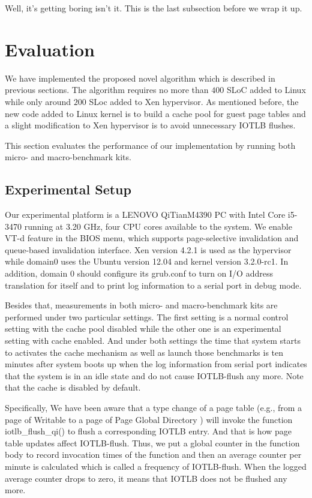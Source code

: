 \documentclass[letterpaper,twocolumn,10pt]{article}
\begin{document}
Well, it's getting boring isn't it.  This is the last subsection
before we wrap it up.

\section{Evaluation}

We have implemented the proposed novel algorithm which is described in previous sections. The algorithm requires no more than $400$ SLoC added to Linux while only around $200$ SLoc added to Xen hypervisor. As mentioned before, the new code added to Linux kernel is to build a cache pool for guest page tables and a slight modification to Xen hypervisor is to avoid unnecessary IOTLB flushes.

This section evaluates the performance of our implementation by running both micro- and macro-benchmark kits.

\subsection{Experimental Setup}

Our experimental platform is a LENOVO QiTianM4390 PC with Intel Core i5-3470 running at 3.20 GHz, four CPU cores available to the system. We enable VT-d feature in the BIOS menu, which supports page-selective invalidation and queue-based invalidation interface. Xen version 4.2.1 is used as the hypervisor while domain0 uses the Ubuntu version 12.04 and kernel version 3.2.0-rc1. In addition, domain 0 should configure its grub.conf to turn on I/O address translation for itself and to print log information to a serial port in debug mode.

Besides that, measurements in both micro- and macro-benchmark kits are performed under two particular settings. The first setting is a normal control setting with the cache pool disabled while the other one is an experimental setting with cache enabled. And under both settings the time that system starts to activates the cache mechanism as well as launch those benchmarks is ten minutes after system boots up when the log information from serial port indicates that the system is in an idle state and do not cause IOTLB-flush any more. Note that the cache is disabled by default. 

Specifically, We have been aware that a type change of a page table (e.g., from a page of Writable to a page of Page Global Directory ) will invoke the function iotlb\_flush\_qi() to flush a corresponding IOTLB entry. And that is how page table updates affect IOTLB-flush. Thus, we put a global counter in the function body to record invocation times of the function and then an average counter per minute is calculated which is called a frequency of IOTLB-flush. When the logged average counter drops to zero, it means that IOTLB does not be flushed any more.
\end{document}
